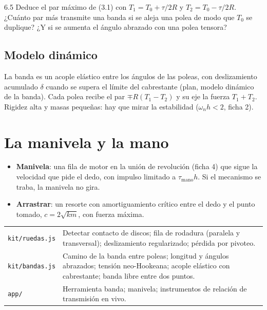 \documentclass[11pt,a4paper]{article}
\begin{document}
\begin{ejercicio}{6.5}
Deduce el par máximo de (3.1) con $T_1 = T_0 + \tau/2R$ y $T_2 = T_0 - \tau/2R$. ¿Cuánto par más transmite una banda
si se aleja una polea de modo que $T_0$ se duplique? ¿Y si se aumenta el ángulo abrazado con una polea tensora?
\end{ejercicio}

\subsection{Modelo dinámico}
La banda es un acople elástico entre los ángulos de las poleas, con deslizamiento acumulado $\delta$ cuando se supera
el límite del cabrestante (plan, modelo dinámico de la banda). Cada polea recibe el par $\mp R(T_1 - T_2)$ y su eje la
fuerza $T_1 + T_2$. Rigidez alta y masas pequeñas: hay que mirar la estabilidad ($\omega_n h < 2$, ficha 2).

\section{La manivela y la mano}

\begin{itemize}[leftmargin=*]
  \item \textbf{Manivela}: una fila de motor en la unión de revolución (ficha 4) que sigue la velocidad que pide el
        dedo, con impulso limitado a $\tau_{\text{mano}}h$. Si el mecanismo se traba, la manivela no gira.
  \item \textbf{Arrastrar}: un resorte con amortiguamiento crítico entre el dedo y el punto tomado,
        $c = 2\sqrt{km}$, con fuerza máxima.
\end{itemize}

\begin{codigo}
\begin{tabularx}{\linewidth}{@{}l Y@{}}
\texttt{kit/ruedas.js} & Detectar contacto de discos; fila de rodadura (paralela y transversal); deslizamiento
  regularizado; pérdida por pivoteo.\\
\texttt{kit/bandas.js} & Camino de la banda entre poleas; longitud y ángulos abrazados; tensión neo-Hookeana;
  acople elástico con cabrestante; banda libre entre dos puntos.\\
\texttt{app/} & Herramienta banda; manivela; instrumentos de relación de transmisión en vivo.\\
\end{tabularx}
\end{codigo}
\end{document}
